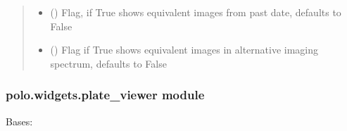 \documentclass[letterpaper,10pt,english]{sphinxmanual}
\begin{document}
\begin{fulllineitems}
\begin{fulllineitems}
\begin{quote}
\begin{description}
\begin{itemize}
\item {} 
 (\sphinxstyleliteralemphasis{\sphinxupquote{, }}) \textendash{} Flag, if True shows equivalent images from past
date, defaults to False

\item {} 
 (\sphinxstyleliteralemphasis{\sphinxupquote{, }}) \textendash{} Flag if True shows equivalent images in alternative
imaging spectrum, defaults to False

\end{itemize}

\end{description}\end{quote}

\end{fulllineitems}


\end{fulllineitems}



\subsubsection{polo.widgets.plate\_viewer module}
\label{\detokenize{polo.widgets:module-polo.widgets.plate_viewer}}\label{\detokenize{polo.widgets:polo-widgets-plate-viewer-module}}

\begin{fulllineitems}
\label{\detokenize{polo.widgets:polo.widgets.plate_viewer.SceneCacher}}
Bases: 

\end{fulllineitems}

\end{document}
